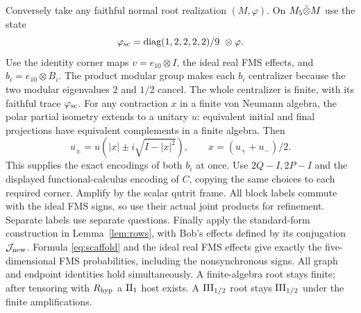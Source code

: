 Conversely take any faithful normal root realization $(M,\varphi)$.
On $M_5\bar\otimes M$ use the state
\begin{equation}\label{eq:scaffold}
 \varphi_{\rm sc}=\operatorname{diag}(1,2,2,2,2)/9\ \otimes\varphi.
\end{equation}
Use the identity corner maps $v=e_{10}\otimes I$, the ideal real
FMS effects, and $b_i=e_{10}\otimes B_i$.
The product modular group makes each $b_i$ centralizer because
the two modular eigenvalues $2$ and $1/2$ cancel.
The whole centralizer is finite, with its faithful trace
$\varphi_{\rm sc}$.
For any contraction $x$ in a finite von Neumann algebra, the polar
partial isometry extends to a unitary $u$: equivalent initial and
final projections have equivalent complements in a finite algebra.
Then
\[
 u_\pm=u(|x|\pm i\sqrt{I-|x|^2}),\qquad x=(u_++u_-)/2.
\]
This supplies the exact encodings of both $b_i$ at once.
Use $2Q-I,2P-I$ and the displayed functional-calculus encoding of
$C$, copying the same choices to each required corner.
Amplify by the scalar qutrit frame. All block labels commute with
the ideal FMS signs, so use their actual joint products for refinement.
Separate labels use separate questions.
Finally apply the standard-form construction in
Lemma~\ref{lem:rows}, with Bob's effects defined by its conjugation
$\mathcal J_{\rm new}$. Formula \eqref{eq:scaffold} and the ideal real FMS
effects give exactly the five-dimensional FMS probabilities, including
the nonsynchronous signs. All graph and endpoint identities hold
simultaneously. A finite-algebra root stays finite; after tensoring
with $R_{\rm hyp}$ a $\mathrm{II}_1$ host exists. A $\mathrm{III}_{1/2}$ root stays
$\mathrm{III}_{1/2}$ under the finite amplifications.

